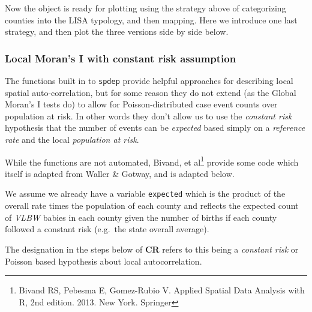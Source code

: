 \documentclass[
]{book}
\newenvironment{Shaded}{\begin{snugshade}}{\end{snugshade}}
\newcommand{\CommentTok}[1]{\textcolor[rgb]{0.56,0.35,0.01}{\textit{#1}}}
\newcommand{\DecValTok}[1]{\textcolor[rgb]{0.00,0.00,0.81}{#1}}
\newcommand{\FunctionTok}[1]{\textcolor[rgb]{0.13,0.29,0.53}{\textbf{#1}}}
\newcommand{\NormalTok}[1]{#1}
\newcommand{\OtherTok}[1]{\textcolor[rgb]{0.56,0.35,0.01}{#1}}
\newcommand{\SpecialCharTok}[1]{\textcolor[rgb]{0.81,0.36,0.00}{\textbf{#1}}}
\begin{document}
\begin{Shaded}
\end{Shaded}

Now the object is ready for plotting using the strategy above of categorizing counties into the LISA typology, and then mapping. Here we introduce one last strategy, and then plot the three versions side by side below.

\hypertarget{local-morans-i-with-constant-risk-assumption}{%
\subsubsection{Local Moran's I with constant risk assumption}\label{local-morans-i-with-constant-risk-assumption}}

The functions built in to \texttt{spdep} provide helpful approaches for describing local spatial auto-correlation, but for some reason they do not extend (as the Global Moran's I tests do) to allow for Poisson-distributed case event counts over population at risk. In other words they don't allow us to use the \emph{constant risk} hypothesis that the number of events can be \emph{expected} based simply on a \emph{reference rate} and the local \emph{population at risk}.

While the functions are not automated, Bivand, et al\footnote{Bivand RS, Pebesma E, Gomez-Rubio V. Applied Spatial Data Analysis with R, 2nd edition. 2013. New York. Springer} provide some code which itself is adapted from Waller \& Gotway, and is adapted below.

We assume we already have a variable \texttt{expected} which is the product of the overall rate times the population of each county and reflects the expected count of \emph{VLBW} babies in each county given the number of births if each county followed a constant risk (e.g.~the state overall average).

The designation in the steps below of \textbf{CR} refers to this being a \emph{constant risk} or Poisson based hypothesis about local autocorrelation.
\end{document}

